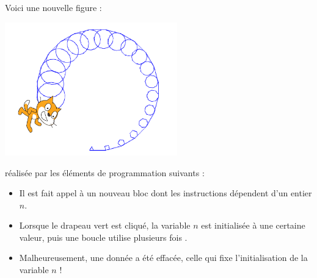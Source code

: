 \documentclass[class=report,crop=false, 12pt]{standalone}
\begin{document}
\begin{enigme}

  Voici une nouvelle figure :
  \begin{center}
    \includegraphics[width=0.56\textwidth]{ecran-11-eg2} 
  \end{center}
  réalisée par les éléments de programmation suivants : 

\begin{minipage}{0.49\textwidth}
\begin{itemize}
  \item Il est fait appel à un nouveau bloc  dont les instructions dépendent d'un entier $n$.

\bigskip
  
  \item Lorsque le drapeau vert est cliqué, la variable $n$ est initialisée à une certaine valeur, puis une boucle utilise plusieurs fois .
  
\bigskip
  
  \item Malheureusement, une donnée a été effacée, celle qui fixe l'initialisation de la variable $n$ !
\end{itemize} 
\end{minipage}
\begin{minipage}{0.49\textwidth}
\begin{center}
\begin{scratch}
\end{scratch}

\bigskip


\end{center}
\end{minipage}
\end{enigme}
\end{document}
